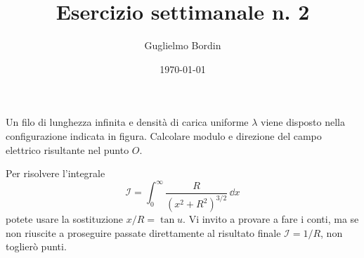 \documentclass[10pt]{gulartcl}
\title{Esercizio settimanale n. 2}
\author{Guglielmo Bordin}
\date{\today}
\begin{document}
\maketitle

\noindent
Un filo di lunghezza infinita e densità di carica uniforme $\lambda$
viene disposto nella configurazione indicata in figura. Calcolare modulo e
direzione del campo elettrico risultante nel punto $O$.

\bigbreak
\begin{center}
\end{center}
\bigbreak

\begin{hint}
Per risolvere l’integrale
\[
    \mathcal{I} = \int_{0}^{\infty} \frac{R}{(x^2 + R^2)^{3/2}} \, \dd x
\]
potete usare la sostituzione $x / R = \tan u$. Vi invito a provare a fare i
conti, ma se non riuscite a proseguire passate direttamente al risultato
finale $\mathcal{I} = 1 / R$, non toglierò punti.
\end{hint}
\end{document}

